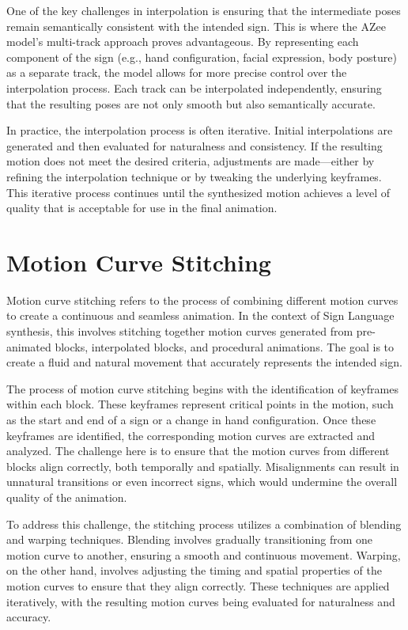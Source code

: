 \documentclass[../../main.tex]{subfiles}
\begin{document}
One of the key challenges in interpolation is ensuring that the intermediate poses remain semantically consistent with the intended sign. This is where the AZee model's multi-track approach proves advantageous. By representing each component of the sign (e.g., hand configuration, facial expression, body posture) as a separate track, the model allows for more precise control over the interpolation process. Each track can be interpolated independently, ensuring that the resulting poses are not only smooth but also semantically accurate.

In practice, the interpolation process is often iterative. Initial interpolations are generated and then evaluated for naturalness and consistency. If the resulting motion does not meet the desired criteria, adjustments are made—either by refining the interpolation technique or by tweaking the underlying keyframes. This iterative process continues until the synthesized motion achieves a level of quality that is acceptable for use in the final animation.

\section{Motion Curve Stitching}
\label{sec:cruve_stitching}

Motion curve stitching refers to the process of combining different motion curves to create a continuous and seamless animation. In the context of Sign Language synthesis, this involves stitching together motion curves generated from pre-animated blocks, interpolated blocks, and procedural animations. The goal is to create a fluid and natural movement that accurately represents the intended sign.

The process of motion curve stitching begins with the identification of keyframes within each block. These keyframes represent critical points in the motion, such as the start and end of a sign or a change in hand configuration. Once these keyframes are identified, the corresponding motion curves are extracted and analyzed. The challenge here is to ensure that the motion curves from different blocks align correctly, both temporally and spatially. Misalignments can result in unnatural transitions or even incorrect signs, which would undermine the overall quality of the animation.

To address this challenge, the stitching process utilizes a combination of blending and warping techniques. Blending involves gradually transitioning from one motion curve to another, ensuring a smooth and continuous movement. Warping, on the other hand, involves adjusting the timing and spatial properties of the motion curves to ensure that they align correctly. These techniques are applied iteratively, with the resulting motion curves being evaluated for naturalness and accuracy.
\end{document}
